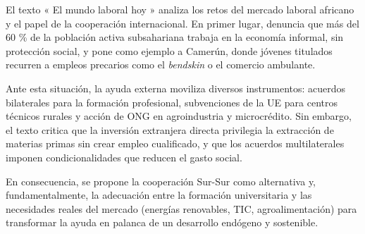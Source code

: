 \documentclass[11pt]{article}
\begin{document}
\begin{textebox}
El texto « El mundo laboral hoy » analiza los retos del mercado laboral africano y el papel de la cooperación internacional. En primer lugar, denuncia que más del 60 \% de la población activa subsahariana trabaja en la economía informal, sin protección social, y pone como ejemplo a Camerún, donde jóvenes titulados recurren a empleos precarios como el \emph{bendskin} o el comercio ambulante.

Ante esta situación, la ayuda externa moviliza diversos instrumentos: acuerdos bilaterales para la formación profesional, subvenciones de la UE para centros técnicos rurales y acción de ONG en agroindustria y microcrédito. Sin embargo, el texto critica que la inversión extranjera directa privilegia la extracción de materias primas sin crear empleo cualificado, y que los acuerdos multilaterales imponen condicionalidades que reducen el gasto social.

En consecuencia, se propone la cooperación Sur-Sur como alternativa y, fundamentalmente, la adecuación entre la formación universitaria y las necesidades reales del mercado (energías renovables, TIC, agroalimentación) para transformar la ayuda en palanca de un desarrollo endógeno y sostenible.
\end{textebox}
\end{document}
